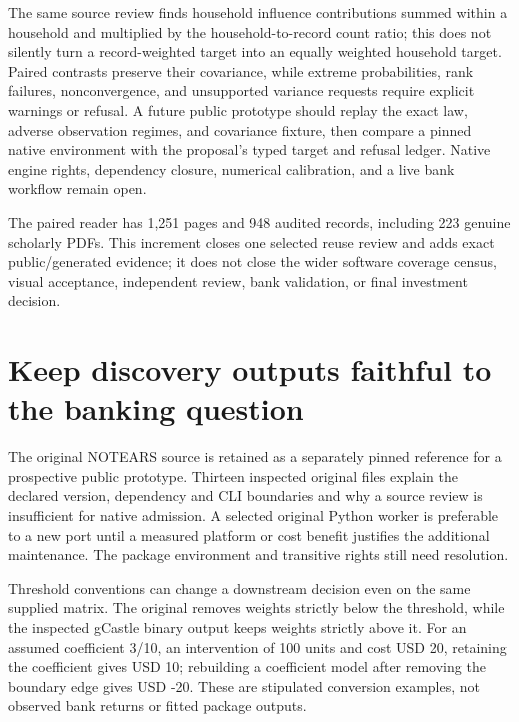 The same source review finds household influence contributions summed
within a household and multiplied by the household-to-record count
ratio; this does not silently turn a record-weighted target into an
equally weighted household target. Paired contrasts preserve their
covariance, while extreme probabilities, rank failures, nonconvergence,
and unsupported variance requests require explicit warnings or refusal.
A future public prototype should replay the exact law, adverse
observation regimes, and covariance fixture, then compare a pinned
native environment with the proposal's typed target and refusal ledger.
Native engine rights, dependency closure, numerical calibration, and a
live bank workflow remain open.
\citep{exec23_ltmle_source,exec23_ltmle_exact}

The paired reader has 1,251 pages and 948 audited records, including 223
genuine scholarly PDFs. This increment closes one selected reuse review
and adds exact public/generated evidence; it does not close the wider
software coverage census, visual acceptance, independent review, bank
validation, or final investment decision.
\citep{sp23nt_reader,sp23nt_progress}

\hypertarget{keep-discovery-outputs-faithful-to-the-banking-question}{%
\section{Keep discovery outputs faithful to the banking
question}\label{keep-discovery-outputs-faithful-to-the-banking-question}}

The original NOTEARS source is retained as a separately pinned reference
for a prospective public prototype. Thirteen inspected original files
explain the declared version, dependency and CLI boundaries and why a
source review is insufficient for native admission. A selected original
Python worker is preferable to a new port until a measured platform or
cost benefit justifies the additional maintenance. The package
environment and transitive rights still need
resolution.\citep{exec23_notears_source}

Threshold conventions can change a downstream decision even on the same
supplied matrix. The original removes weights strictly below the
threshold, while the inspected gCastle binary output keeps weights
strictly above it. For an assumed coefficient 3/10, an intervention of
100 units and cost USD 20, retaining the coefficient gives USD 10;
rebuilding a coefficient model after removing the boundary edge gives
USD -20. These are stipulated conversion examples, not observed bank
returns or fitted package
outputs.\citep{exec23_notears_source,exec20_gcastle_source,exec23_notears_reference}

